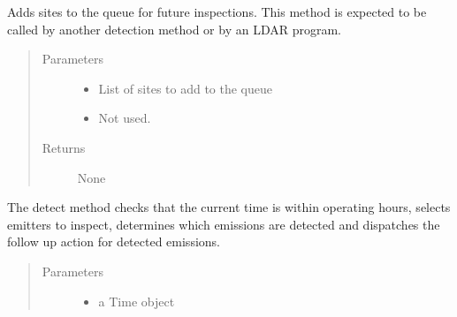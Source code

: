 \documentclass[letterpaper,10pt,english]{sphinxmanual}
\begin{document}
\begin{fulllineitems}
\begin{quote}
\begin{description}
\end{description}\end{quote}

\begin{fulllineitems}
\label{\detokenize{index:feast.DetectionModules.comp_survey.CompSurvey.action}}
Adds sites to the queue for future inspections. This method is expected to be called by another detection
method or by an LDAR program.
\begin{quote}\begin{description}
\item[{Parameters}] \leavevmode\begin{itemize}
\item {} 
 \textendash{} List of sites to add to the queue

\item {} 
 \textendash{} Not used.

\end{itemize}

\item[{Returns}] \leavevmode
None

\end{description}\end{quote}

\end{fulllineitems}


\begin{fulllineitems}
\label{\detokenize{index:feast.DetectionModules.comp_survey.CompSurvey.detect}}
The detect method checks that the current time is within operating hours, selects emitters to inspect,
determines which emissions are detected and dispatches the follow up action for detected emissions.
\begin{quote}\begin{description}
\item[{Parameters}] \leavevmode\begin{itemize}
\item {} 
 \textendash{} a Time object


\end{itemize}
\end{description}
\end{quote}
\end{fulllineitems}
\end{fulllineitems}
\end{document}
